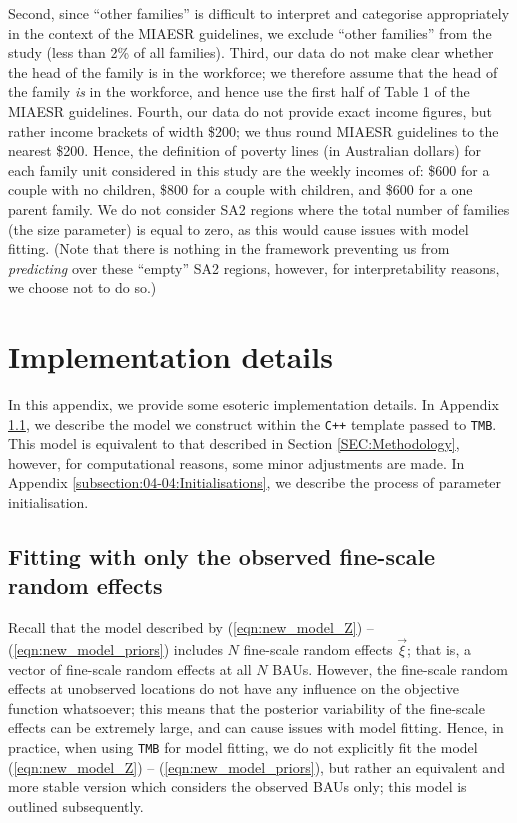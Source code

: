 \documentclass[12pt,a4paper]{article}
\begin{document}
\begin{appendices}
Second, since ``other families'' is difficult to interpret and categorise appropriately in the context of the MIAESR guidelines, we exclude ``other families'' from the study (less than 2\% of all families). 
Third, our data do not make clear whether the head of the family is in the workforce; we therefore assume that the head of the family \textit{is} in the workforce, and hence use the first half of Table 1 of the MIAESR guidelines.
Fourth, our data do not provide exact income figures, but rather income brackets of width \$200; we thus round MIAESR guidelines to the nearest \$200. 
Hence, the definition of poverty lines (in Australian dollars) for each family unit considered in this study are the weekly incomes of: \$600 for a couple with no children, \$800 for a couple with children, and \$600 for a one parent family. 
We do not consider SA2 regions where the total number of families (the size parameter) is equal to zero, as this would cause issues with model fitting.
(Note that there is nothing in the framework preventing us from \textit{predicting} over these ``empty'' SA2 regions, however, for interpretability reasons, we choose not to do so.)


\section{Implementation details}\label{appendix:implementation_details}

In this appendix, we provide some esoteric implementation details. In Appendix \ref{appendix:implementation_details:fitting_with_only_observed_fine-scale}, we describe the model we construct within the \texttt{C++} template passed to \texttt{TMB}. 
This model is equivalent to that described in Section \ref{SEC:Methodology}, however, for computational reasons, some minor adjustments are made. 
In Appendix \ref{subsection:04-04:Initialisations}, we describe the process of parameter initialisation. 


\subsection{Fitting with only the observed fine-scale random effects}\label{appendix:implementation_details:fitting_with_only_observed_fine-scale}

Recall that the model described by (\ref{eqn:new_model_Z}) -- (\ref{eqn:new_model_priors}) includes $N$ fine-scale random effects $\vec{\xi}$; that is, a vector of fine-scale random effects at all $N$ BAUs. 
However, the fine-scale random effects at unobserved locations do not have any influence on the objective function whatsoever; this means that the posterior variability of the fine-scale effects can be extremely large, and can cause issues with model fitting.
Hence, in practice, when using \texttt{TMB} for model fitting, we do not explicitly fit the model (\ref{eqn:new_model_Z}) -- (\ref{eqn:new_model_priors}), but rather an equivalent and more stable version which considers the observed BAUs only; this model is outlined subsequently. 


\end{appendices}
\end{document}
